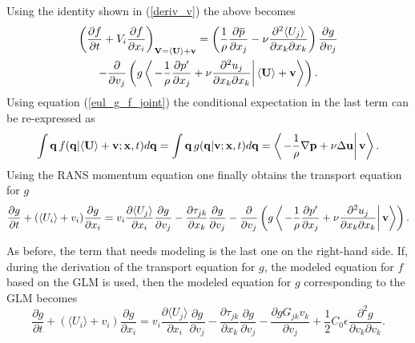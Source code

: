 \documentclass[oneside,a4paper,11pt]{report}
\newcommand{\pavg}{\overline{p}}
\newcommand{\pfluc}{p'}
\newcommand{\rs}{\tau}          %
\newcommand{\uiavg}{\langle U_i \rangle}
\newcommand{\ujavg}{\langle U_j \rangle}
\newcommand{\ujfluc}{u_j}
\begin{document}
Using the identity shown in (\ref{deriv_v}) the above becomes
\begin{multline}
\left ( \frac{\partial f}{\partial t} + V_i \frac{\partial f}{\partial x_i} \right )_{\Vvec = \langle \Uvec \rangle + \vvec} = \left ( \frac{1}{\rho} \frac{\partial \pavg}{\partial x_j} -\nu \frac{\partial^2 \ujavg}{\partial x_k \partial x_k} \right) \frac{\partial g}{\partial v_j} \\
- \frac{\partial}{\partial v_j} \left ( g \left < \left . - \frac{1}{\rho} \frac{\partial \pfluc}{\partial x_j} +  \nu \frac{\partial ^2 \ujfluc}{\partial x_k \partial x_k} \right | \langle \Uvec \rangle + \vvec \right > \right ). \end{multline}
Using equation (\ref{eul_g_f_joint}) the conditional expectation in the last term can be re-expressed as
\begin{equation}
\int \mathbf{q}\, f(\mathbf{q} | \langle \mathbf{U} \rangle + \mathbf{v}; \mathbf{x}, t) d\mathbf{q} = \int \mathbf{q}\, g(\mathbf{q} | \mathbf{v}; \mathbf{x}, t) d\mathbf{q} = \left < \left . - \frac{1}{\rho} \nabla \mathbf{p} +  \nu \Delta \mathbf{u} \right | \mathbf{v} \right >.
\end{equation}
Using the RANS momentum equation one finally obtains the transport equation for $g$
\begin{equation}
\frac{\partial g}{\partial t} + ( \uiavg + v_i ) \frac{\partial g}{\partial x_i} = v_i \frac{\partial \ujavg}{\partial x_i} \frac{\partial g}{\partial v_j} - \frac{\partial \rs_{jk}}{\partial x_k} \frac{\partial g}{\partial v_j} - \frac{\partial}{\partial v_j} \left ( g \left < \left . - \frac{1}{\rho} \frac{\partial \pfluc}{\partial x_j} +  \nu \frac{\partial ^2 \ujfluc}{\partial x_k \partial x_k} \right | \vvec \right > \right ).
\end{equation}

As before, the term that needs modeling is the last one on the right-hand side. If, during the derivation of the transport equation for $g$, the modeled equation for $f$ based on the GLM is used, then the modeled equation for $g$ corresponding to the GLM becomes
\begin{equation}
\frac{\partial g}{\partial t} + ( \uiavg + v_i ) \frac{\partial g}{\partial x_i} = v_i \frac{\partial \ujavg}{\partial x_i} \frac{\partial g}{\partial v_j} - \frac{\partial \rs_{jk}}{\partial x_k} \frac{\partial g}{\partial v_j} - \frac{\partial g G_{jk} v_k}{\partial v_j}  + \frac{1}{2} C_0 \epsilon \frac{\partial^2 g}{\partial v_k \partial v_k}.
\end{equation}
\end{document}
